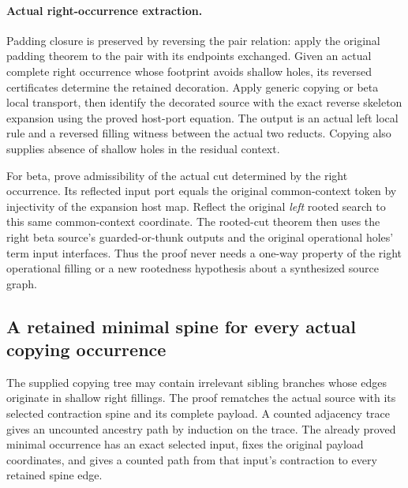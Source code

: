 \par{}

\par{}
\paragraph{Actual right-occurrence extraction.}
Padding closure is preserved by reversing the pair relation: apply the
original padding theorem to the pair with its endpoints exchanged. Given
an actual complete right occurrence whose footprint avoids shallow holes,
its reversed certificates determine the retained decoration. Apply generic
copying or beta local transport, then identify the decorated source with
the exact reverse skeleton expansion using the proved host-port equation.
The output is an actual left local rule and a reversed filling witness
between the actual two reducts. Copying also supplies absence of shallow
holes in the residual context.

For beta, prove admissibility of the actual cut determined by the right
occurrence. Its reflected input port equals the original common-context
token by injectivity of the expansion host map. Reflect the original
\emph{left} rooted search to this same common-context coordinate. The
rooted-cut theorem then uses the right beta source's guarded-or-thunk
outputs and the original operational holes' term input interfaces.
Thus the proof never needs a one-way property of the right operational
filling or a new rootedness hypothesis about a synthesized source graph.

\subsection{A retained minimal spine for every actual copying occurrence}
The supplied copying tree may contain irrelevant sibling branches whose
edges originate in shallow right fillings. The proof rematches the actual
source with its selected contraction spine and its complete payload.
A counted adjacency trace gives an uncounted ancestry path by induction
on the trace. The already proved minimal occurrence has an exact selected
input, fixes the original payload coordinates, and gives a counted path
from that input's contraction to every retained spine edge.

